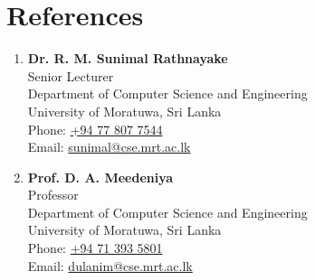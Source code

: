 \documentclass[a4paper,11pt]{article}
\let\hrefWithoutArrow\href
\renewcommand{\href}[2]{\hrefWithoutArrow{#1}{\ifthenelse{\equal{#2}{}}{ }{#2 }\raisebox{.15ex}{\footnotesize \faExternalLink*}}}
\begin{document}
\section{\textbf{References}}
\vspace{-0.2 mm}
\small{
\begin{multicols}{2}
\begin{enumerate}[leftmargin=*,labelsep=2mm]

\item \textbf{Dr. R. M. Sunimal Rathnayake}\\
   Senior Lecturer\\
   Department of Computer Science and Engineering\\
   University of Moratuwa, Sri Lanka\\
   Phone: \hrefWithoutArrow{tel:+94778077544}{+94 77 807 7544}\\
   Email: \hrefWithoutArrow{mailto:sunimal@cse.mrt.ac.lk}{sunimal@cse.mrt.ac.lk}\\

\item \textbf{Prof. D. A. Meedeniya}\\
   Professor\\
   Department of Computer Science and Engineering\\
   University of Moratuwa, Sri Lanka\\
   Phone: \hrefWithoutArrow{tel:+94713935801}{+94 71 393 5801}\\
   Email: \hrefWithoutArrow{mailto:dulanim@cse.mrt.ac.lk}{dulanim@cse.mrt.ac.lk}\\
\end{enumerate}
\end{multicols}
}
\end{document}
